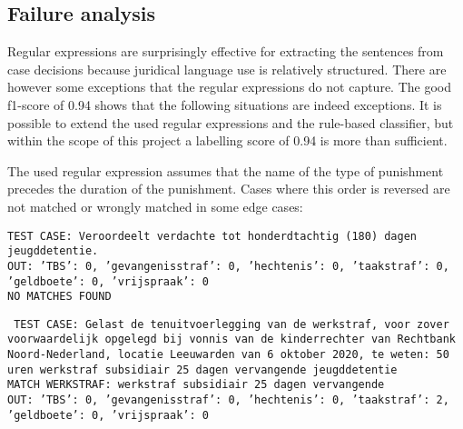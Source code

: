 \documentclass[a4paper]{article}
\begin{document}

\subsection{Failure analysis}\label{sec:failure_analysis}

Regular expressions are surprisingly effective for extracting the sentences from case decisions because juridical language use is relatively structured.
There are however some exceptions that the regular expressions do not capture.
The good f1-score of 0.94 shows that the following situations are indeed exceptions.
It is possible to extend the used regular expressions and the rule-based classifier, but within the scope of this project a labelling score of 0.94 is more than sufficient.

The used regular expression assumes that the name of the type of punishment precedes the duration of the punishment.
Cases where this order is reversed are not matched or wrongly matched in some edge cases:

\texttt{TEST CASE:
Veroordeelt verdachte tot honderdtachtig (180) dagen jeugddetentie.\\
OUT: {'TBS': 0, 'gevangenisstraf': 0, 'hechtenis': 0, 'taakstraf': 0, 'geldboete': 0, 'vrijspraak': 0}\\
NO MATCHES FOUND
}

\texttt{
TEST CASE: %
Gelast de tenuitvoerlegging van de werkstraf, voor zover voorwaardelijk opgelegd bij vonnis van de kinderrechter van Rechtbank Noord-Nederland, locatie Leeuwarden van 6 oktober 2020, te weten: 50 uren werkstraf subsidiair 25 dagen vervangende jeugddetentie\\
MATCH WERKSTRAF: werkstraf subsidiair 25 dagen vervangende\\
OUT: {'TBS': 0, 'gevangenisstraf': 0, 'hechtenis': 0, 'taakstraf': 2, 'geldboete': 0, 'vrijspraak': 0}\\
}
\end{document}
